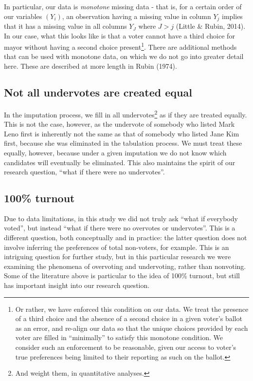 \documentclass[12pt,twoside]{reedthesis}
\begin{document}
In particular, our data is \emph{monotone} missing data - that is, for a certain order of our variables \((Y_i)\), an observation having a missing value in column \(Y_j\) implies that it has a missing value in all columns \(Y_J\) where \(J > j\) (Little \& Rubin, 2014). In our case, what this looks like is that a voter cannot have a third choice for mayor without having a second choice present\footnote{Or rather, we have enforced this condition on our data. We treat the presence of a third choice and the absence of a second choice in a given voter's ballot as an error, and re-align our data so that the unique choices provided by each voter are filled in ``minimally'' to satisfy this monotone condition. We consider such an enforcement to be reasonable, given our access to voter's true preferences being limited to their reporting as such on the ballot.}. There are additional methods that can be used with monotone data, on which we do not go into greater detail here. These are described at more length in Rubin (1974).

\hypertarget{not-all-undervotes-are-created-equal}{%
\subsection{Not all undervotes are created equal}\label{not-all-undervotes-are-created-equal}}

In the imputation process, we fill in all undervotes\footnote{And weight them, in quantitative analyses.} as if they are treated equally. This is not the case, however, as the undervote of somebody who listed Mark Leno first is inherently not the same as that of somebody who listed Jane Kim first, because she was eliminated in the tabulation process. We must treat these equally, however, because under a given imputation we do not know which candidates will eventually be eliminated. This also maintains the spirit of our research question, ``what if there were no undervotes''.

\hypertarget{turnout}{%
\subsection{100\% turnout}\label{turnout}}

Due to data limitations, in this study we did not truly ask ``what if everybody voted'', but instead ``what if there were no overvotes or undervotes''. This is a different question, both conceptually and in practice: the latter question does not involve inferring the preferences of total non-voters, for example. This is an intriguing question for further study, but in this particular research we were examining the phenomena of overvoting and undervoting, rather than nonvoting. Some of the literature above is particular to the idea of 100\% turnout, but still has important insight into our research question.
\end{document}

